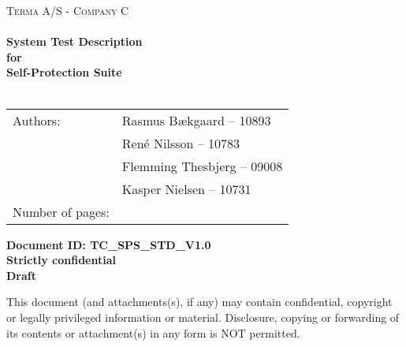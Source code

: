 \documentclass[Main]{subfiles}
\begin{document}
\begin{center}

\textsc{\Large Terma A/S - Company C}\\[0.5cm]


\HRule \\[0.4cm]

{ \huge \bfseries System Test Description}\\[0.4cm]
{ \huge \bfseries for}\\[0.4cm] 
{ \huge \bfseries Self-Protection Suite}\\[0.4cm]

\HRule \\[1.5cm]

\begin{tabular}{p{}|p{}}
\hline 
Authors: & Rasmus Bækgaard -- 10893\\ &René Nilsson -- 10783\\ &Flemming Thesbjerg -- 09008\\ &Kasper Nielsen -- 10731\\ 
\hline 
Number of pages: & \pageref{LastPage} \\
\hline 
\end{tabular} 

\textbf{\Large Document ID: TC\_SPS\_STD\_V1.0}\\
\textbf{\Large Strictly confidential}\\
\textbf{\Large Draft}

This document (and attachments(s), if any) may contain confidential, copyright or legally privileged information or material.
Disclosure, copying or forwarding of its contents or attachment(s) in any form is NOT permitted.
\end{center}
\end{document}

